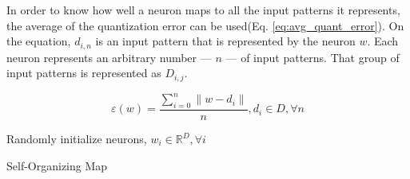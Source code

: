 \documentclass[journal]{IEEEtran}
\begin{document}
In order to know how well a neuron maps to all the input patterns it represents, the average of the quantization error can be used(Eq. \ref{eq:avg_quant_error}). On the equation, $d_{i,n}$ is an input pattern that is represented by the neuron $w$. Each neuron represents an arbitrary number --- $n$ --- of input patterns. That group of input patterns is represented as $D_{i,j}$.
\par

\begin{equation}
  \label{eq:avg_quant_error}
  \varepsilon(w) = \frac{\sum_{i=0}^{n} \| w - d_{i}  \| }{n}, d_{i} \in D, \forall n
\end{equation} 

  \begin{algorithm*}
    \label{alg:som}
    \DontPrintSemicolon
    Randomly initialize neurons, $w_i \in \mathbb{R}^{D}, \forall i $ \;
      \caption{Self-Organizing Map \cite[]{Kohonen1990} }
  \end{algorithm*}
\end{document}
